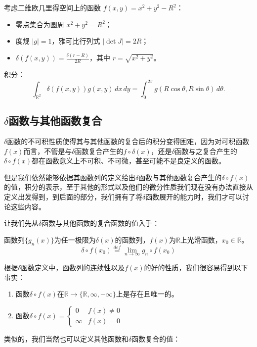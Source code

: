 \documentclass[lang=cn,10pt,newtx,bibend=biber,device=pad]{elegantbook}
\begin{document}
\begin{example}
    考虑二维欧几里得空间上的函数 $f(x, y) = x^2 + y^2 - R^2$：
    \begin{itemize}
        \item 零点集合为圆周 $x^2 + y^2 = R^2$；
        \item 度规 $|g| = 1$，雅可比行列式 $|\det J| = 2R$；
        \item $\delta(f(x, y)) = \frac{\delta(r-R)}{2R}$，其中 $r = \sqrt{x^2 + y^2}$。
    \end{itemize}
    
    积分：
    \begin{equation}
    \int_{\mathbb{R}^2} \delta(f(x, y)) g(x, y) \, dx \, dy = \int_0^{2\pi} g(R \cos\theta, R \sin\theta) \, d\theta.
    \end{equation}
        
\end{example}
\subsection{$\delta$函数与其他函数复合}
$\delta$函数的不可积性质使得其与其他函数的复合后的积分变得困难，因为对可积函数$f(x)$而言，不管是与$\delta$函数复合产生的$f\circ\delta(x)$，还是$\delta$函数与之复合产生的$\delta\circ f(x)$都在函数意义上不可积、不可微，甚至可能不是良定义的函数。

但是我们依然能够依据其函数列的定义给出$\delta$函数与其他函数复合产生的$\delta\circ f(x)$的值，积分的表示，至于其他的形式以及他们的微分性质我们现在没有办法直接从定义出发得到，到后面的部分，我们拥有了将$\delta$函数展开的能力时，我们才可以讨论这些内容。

让我们先从$\delta$函数与其他函数的复合函数的值入手：

\begin{definition}
函数列$\{g_n(x)\}$为任一极限为$\delta(x)$的函数列，$f(x)$为$\mathbb{R}$上光滑函数，$x_0\in \mathbb{R}$。
\begin{equation}
\delta\circ f(x_0) \overset{def}{=} \lim_{n\rightarrow\infty} g_n\circ f(x_0)
\end{equation}
\end{definition}

根据$\delta$函数定义中，函数列的连续性以及$f(x)$的好的性质，我们很容易得到以下事实：
\begin{enumerate}
    \item 函数$\delta\circ f(x)$在$\mathbb{R}\rightarrow\{\mathbb{R},\infty,-\infty\}$上是存在且唯一的。
    \item 函数$\delta\circ f(x) =  \begin{cases} 0 & f(x)\neq 0 \\ \infty & f(x)=0 \end{cases}$
\end{enumerate}
类似的，我们当然也可以定义其他函数和$\delta$函数复合的值：
\end{document}
